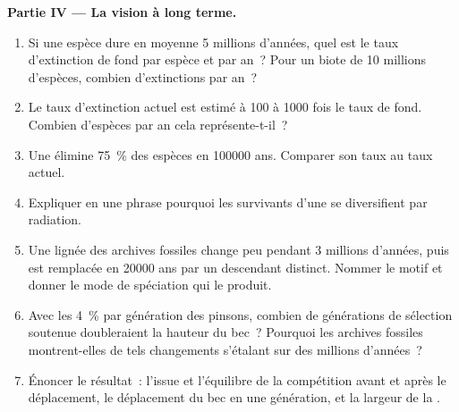 \begin{problem}
\medskip
\noindent\textbf{Partie IV --- La vision à long terme.}
\begin{enumerate}[resume]
  \item Si une espèce dure en moyenne 5 millions d'années, quel est le
        taux d'extinction de fond par espèce et par an~? Pour un biote
        de 10 millions d'espèces, combien d'extinctions par an~?
  \item Le taux d'extinction actuel est estimé à 100 à 1000
        fois le taux de fond. Combien d'espèces par an cela représente-t-il~?
  \item Une  élimine \qty{75}{\%} des espèces en
        \num{100000} ans. Comparer son taux au taux actuel.
  \item Expliquer en une phrase pourquoi les survivants d'une  se diversifient par radiation.
  \item Une lignée des archives fossiles change peu pendant 3 millions
        d'années, puis est remplacée en \num{20000} ans par un
        descendant distinct. Nommer le motif et donner le mode de
        spéciation qui le produit.
  \item Avec les \qty{4}{\%} par génération des pinsons, combien de
        générations de sélection soutenue doubleraient la hauteur du
        bec~? Pourquoi les archives fossiles montrent-elles de tels
        changements s'étalant sur des millions d'années~?
  \item Énoncer le résultat~: l'issue et l'équilibre de la compétition
        avant et après le déplacement, le déplacement du bec en une
        génération, et la largeur de la .
\end{enumerate}
\end{problem}
